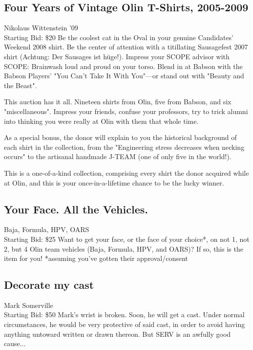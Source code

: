 \documentclass[11pt]{article}
\begin{document}
\subsection{Four Years of Vintage Olin T-Shirts, 2005-2009}
Nikolaus Wittenstein '09
\\
Starting Bid: \$20
\newline
Be the coolest cat in the Oval in your genuine Candidates' Weekend 2008 shirt. 
Be the center of attention with a titillating Sausagefest 2007 shirt (Achtung: Der Sausages ist hüge!).
Impress your SCOPE advisor with SCOPE: Brainwash loud and proud on your torso.
Blend in at Babson with the Babson Players' "You Can't Take It With You"—or stand out with "Beauty and the Beast".

This auction has it all. Nineteen shirts from Olin, five from Babson, and six "miscellaneous". Impress your friends, confuse your professors, try to trick alumni into thinking you were really at Olin with them that whole time.

As a special bonus, the donor will explain to you the historical background of each shirt in the collection, from the "Engineering stress decreases when necking occurs" to the artisanal handmade J-TEAM (one of only five in the world!).

This is a one-of-a-kind collection, comprising every shirt the donor acquired while at Olin, and this is your once-in-a-lifetime chance to be the lucky winner.
\subsection{Your Face. All the Vehicles.}
Baja, Formula, HPV, OARS
\\
Starting Bid: \$25
\newline
Want to get your face, or the face of your choice*, on not 1, not 2, but 4 Olin team vehicles (Baja, Formula, HPV, and OARS)? If so, this is the item for you! *assuming you've gotten their approval/consent
\subsection{Decorate my cast}
Mark Somerville
\\
Starting Bid: \$50
\newline
Mark's wrist is broken.  Soon, he will get a cast.  Under normal circumstances, he would be very protective of said cast, in order to avoid having anything untoward written or drawn thereon.  But SERV is an awfully good cause... 
\end{document}
